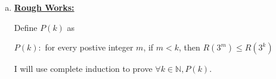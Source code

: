 \documentclass[12pt]{article}
\begin{document}
\begin{enumerate}[a.]
    \item

    \bigskip

    \begin{mdframed}

    \underline{\textbf{Rough Works:}}

    \bigskip

    Define $P(k)$ as

    \begin{center}
        $P(k):$ for every postive integer $m$, if $m < k$, then $R(3^m) \leq R(3^k)$
    \end{center}

    \bigskip

    I will use complete induction to prove $\forall k \in \mathbb{N}, P(k)$.

    \end{mdframed}

\end{enumerate}
\end{document}
